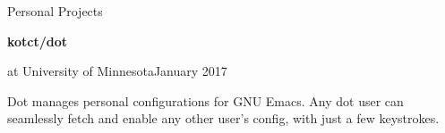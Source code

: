 \begin{minipage}[t]{0.665\textwidth}


  \vspace{10pt}

  {\sectionfont Personal Projects}

  \vspace{5pt}
  \textbf{kotct/dot}\quad{}
  \begin{adjustwidth}{10pt}{}
    \emph{} at University of Minnesota\hfill January 2017

    Dot manages personal configurations for GNU Emacs.
    Any dot user can seamlessly fetch and enable any other user's config, with just a few keystrokes.
  \end{adjustwidth}




\end{minipage}


